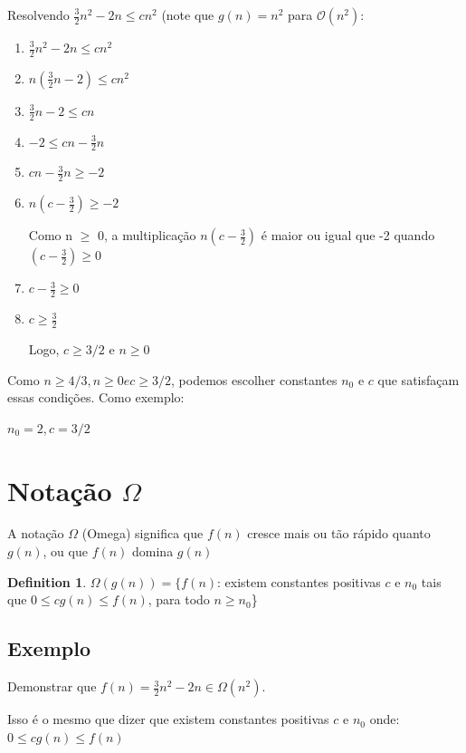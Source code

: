 \documentclass[ a4paper, twocolumn]{article}
\theoremstyle{definition}
\newtheorem{definition}{Definition}[section]
\begin{document}
Resolvendo $\frac{3}{2}n^2 - 2n  \leq cn^2$ (note que $g(n) = n^2$ para $\mathcal{O}(n^2)$:

\begin{enumerate}[Step 1:]
\item $\frac{3}{2}n^2 - 2n \leq cn^2$

\item $n(\frac{3}{2}n - 2) \leq cn^2$

\item $\frac{3}{2}n - 2 \leq cn$

\item $- 2 \leq cn - \frac{3}{2}n$

\item $cn - \frac{3}{2}n \geq -2$

\item $n(c - \frac{3}{2}) \geq -2$

Como n  $\geq$ 0, a multiplicação $n(c - \frac{3}{2})$ é maior ou igual que -2 quando $(c - \frac{3}{2}) \geq 0$

\item $c - \frac{3}{2} \geq 0$

\item $c \geq \frac{3}{2}$

Logo, $c \geq 3/2$ e $n \geq 0$

\end{enumerate}

Como $n \geq 4/3, n \geq 0 e c \geq 3/2$, podemos escolher constantes $n_0$ e $c$ que satisfaçam essas condições. Como exemplo:

$ n_0 = 2, c = 3/2$

\section{Notação $\Omega$}
A notação $\Omega$ (Omega) significa que $f(n)$ cresce mais ou tão rápido quanto $g(n)$, ou que $f(n)$ domina $g(n)$

\begin{definition}
$\Omega (g(n)) = \{f(n)$: existem constantes positivas $c$ e $n_0$ tais que $0 \leq cg(n) \leq f(n)$, para todo $n \geq n_0$\}
\end{definition}


\subsection{Exemplo}
Demonstrar que $f(n) = \frac{3}{2}n^2 - 2n \in \Omega(n^2)$. 

Isso é o mesmo que dizer que existem constantes positivas $c$ e $n_0$ onde: 
$0 \leq cg(n) \leq f(n)$
\end{document}
